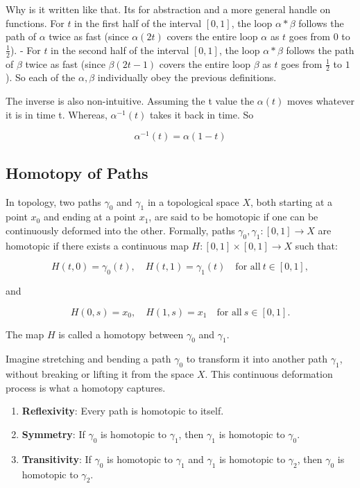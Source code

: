 \documentclass{article}
\begin{document}
Why is it written like that. Its for abstraction and a more general handle on functions. 
For \( t \) in the first half of the interval \([0, 1]\), the loop \(\alpha * \beta\) follows the path of \(\alpha\) twice as fast (since \( \alpha(2t) \) covers the entire loop \(\alpha\) as \( t \) goes from \( 0 \) to \( \frac{1}{2} \)).
- For \( t \) in the second half of the interval \([0, 1]\), the loop \(\alpha * \beta\) follows the path of \(\beta\) twice as fast (since \( \beta(2t - 1) \) covers the entire loop \(\beta\) as \( t \) goes from \( \frac{1}{2} \) to \( 1 \)). So each of the \( \alpha, \beta \) individually obey the previous definitions. 

The inverse is also non-intuitive. Assuming the t value the \( \alpha(t) \) moves whatever it is in time t. Whereas, \( \alpha^{-1}(t) \) takes it back in time. So 

\[ \alpha^{-1}(t) = \alpha(1-t) \]

\subsection{Homotopy of Paths}

\begin{theorem}
    In topology, two paths \(\gamma_0\) and \(\gamma_1\) in a topological space \(X\), both starting at a point \(x_0\) and ending at a point \(x_1\), are said to be homotopic if one can be continuously deformed into the other. Formally, paths \(\gamma_0, \gamma_1: [0, 1] \to X\) are homotopic if there exists a continuous map \(H: [0, 1] \times [0, 1] \to X\) such that:

\[
H(t, 0) = \gamma_0(t), \quad H(t, 1) = \gamma_1(t) \quad \text{for all} \ t \in [0, 1],
\]

and

\[
H(0, s) = x_0, \quad H(1, s) = x_1 \quad \text{for all} \ s \in [0, 1].
\]

The map \(H\) is called a homotopy between \(\gamma_0\) and \(\gamma_1\).

\end{theorem}

Imagine stretching and bending a path \(\gamma_0\) to transform it into another path \(\gamma_1\), without breaking or lifting it from the space \(X\). This continuous deformation process is what a homotopy captures.

\begin{enumerate}
    \item \textbf{Reflexivity}: Every path is homotopic to itself.
    \item \textbf{Symmetry}: If \(\gamma_0\) is homotopic to \(\gamma_1\), then \(\gamma_1\) is homotopic to \(\gamma_0\).
    \item \textbf{Transitivity}: If \(\gamma_0\) is homotopic to \(\gamma_1\) and \(\gamma_1\) is homotopic to \(\gamma_2\), then \(\gamma_0\) is homotopic to \(\gamma_2\).
\end{enumerate}
\end{document}

